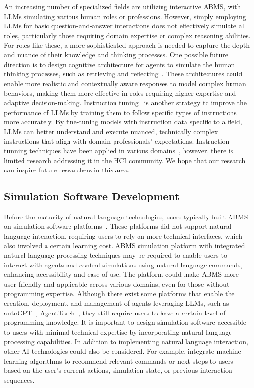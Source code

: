 An increasing number of specialized fields are utilizing interactive ABMS, with LLMs simulating various human roles or professions.
However, simply employing LLMs for basic question-and-answer interactions does not effectively simulate all roles, particularly those requiring domain expertise or complex reasoning abilities.
For roles like these, a more sophisticated approach is needed to capture the depth and nuance of their knowledge and thinking processes.
One possible future direction is to design cognitive architecture for agents to simulate the human thinking processes, such as retrieving and reflecting~\cite{10.1145/3586183.3606763}.
These architectures could enable more realistic and contextually aware responses to model complex human behaviors, making them more effective in roles requiring higher expertise and adaptive decision-making.
Instruction tuning~\cite{zhang2024instructiontuninglargelanguage} is another strategy to improve the performance of LLMs by training them to follow specific types of instructions more accurately.
By fine-tuning models with instruction data specific to a field, LLMs can better understand and execute nuanced, technically complex instructions that align with domain professionals' expectations.
Instruction tunning techniques have been applied in various domains~\cite{zhang2023multitaskinstructiontuningllama,liu2023goatfinetunedllamaoutperforms}, however, there is limited research addressing it in the HCI community. %
We hope that our research can inspire future researchers in this area.




\subsection{Simulation Software Development}\label{software}
Before the maturity of natural language technologies, users typically built ABMS on simulation software platforms~\cite{doi:10.1177/0037549706073695,berryman2008review}. %
These platforms did not support natural language interaction, requiring users to rely on more technical interfaces, which also involved a certain learning cost.
ABMS simulation platform with integrated natural language processing techniques may be required to enable users to interact with agents and control simulations using natural language commands, enhancing accessibility and ease of use. 
The platform could make ABMS more user-friendly and applicable across various domains, even for those without programming expertise.
Although there exist some platforms that enable the creation, deployment, and management of agents leveraging LLMs, such as autoGPT~\cite{Significant_Gravitas_AutoGPT}, AgentTorch~\cite{chopra2023agenttorch}, they still require users to have a certain level of programming knowledge.
It is important to design simulation software accessible to users with minimal technical expertise by incorporating natural language processing capabilities. 
In addition to implementing natural language interaction, other AI technologies could also be considered. 
For example, integrate machine learning algorithms to recommend relevant commands or next steps to users based on the user’s current actions, simulation state, or previous interaction sequences. 

